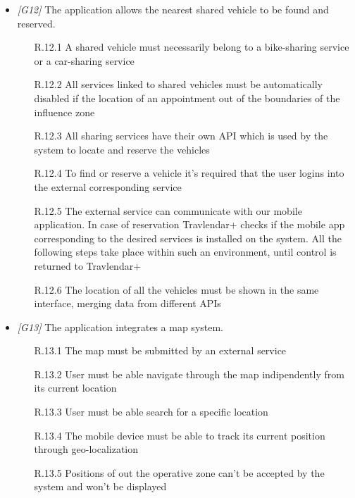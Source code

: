 \begin{itemize}
\item \textit{[G12]} The application allows the nearest shared vehicle to be found and reserved.

                   \begin{itemize}
                        \item [R.12.1] A shared vehicle must necessarily belong to a bike-sharing service or a car-sharing service
                        \item [R.12.2] All services linked to shared vehicles must be automatically disabled if the location of an appointment out of the boundaries of the influence zone
                        \item [R.12.3] All sharing services have their own API which is used by the system to locate and reserve the vehicles
                        \item [R.12.4] To find or reserve a vehicle it's required that the user logins into the external corresponding service
                        \item [R.12.5] The external service can communicate with our mobile application. In case of reservation Travlendar+ checks if the mobile app corresponding to the desired services is installed on the system. All the following steps take place within such an environment, until control is returned to Travlendar+
                        \item [R.12.6] The location of all the vehicles must be shown in the same interface, merging data from different APIs
                        \end{itemize}

\item \textit{[G13]} The application integrates a map system.
                   
                  \begin{itemize}
                        \item [R.13.1] The map must be submitted by an external service 
                        \item [R.13.2] User must be able navigate through the map indipendently from its current location
                        \item [R.13.3] User must be able search for a specific location
                        \item [R.13.4] The mobile device must be able to track its current position through geo-localization
                        \item [R.13.5] Positions of out the operative zone can't be accepted by the system and won't be displayed
                   \end{itemize}


\end{itemize}
